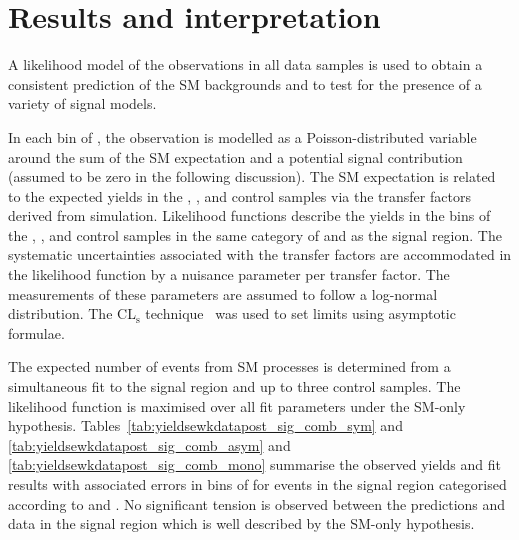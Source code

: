 \section{Results and interpretation}
\label{sec:interpretation}

A likelihood model of the observations in all data samples is
used to obtain a consistent prediction of the SM backgrounds and to
test for the presence of a variety of signal models.

In each bin of \scalht, the observation is modelled as a
Poisson-distributed variable around the sum of the SM expectation and a
potential signal contribution (assumed to be zero in the following
discussion). The SM expectation is related to the expected yields in
the \mj, \mmj, and \gj control samples via the transfer factors
derived from simulation. Likelihood functions describe the yields in the \scalht bins
of the \mj, \mmj, and \gj control samples in the same category of
\njet and \nb as the signal region. The systematic uncertainties
associated with the transfer factors are accommodated in the
likelihood function by a nuisance parameter per transfer factor. The
measurements of these parameters are assumed to follow a log-normal
distribution. The CL$_{\mathrm{s}}$ technique~\cite{read, Cowan:2010js} was used to set limits using asymptotic formulae.

The expected number of events from SM processes is determined from a
simultaneous fit to the signal region and up to three control
samples. The likelihood function is maximised over all fit parameters
under the SM-only hypothesis.
Tables~\ref{tab:yieldsewkdatapost_sig_comb_sym} and \ref{tab:yieldsewkdatapost_sig_comb_asym} and
\ref{tab:yieldsewkdatapost_sig_comb_mono} summarise
the observed yields and fit results with associated errors in bins of \scalht for events in the signal region
categorised according to \njet and \nb. 
No significant tension is observed between the predictions and data in the
signal region which is well described by the SM-only hypothesis.








